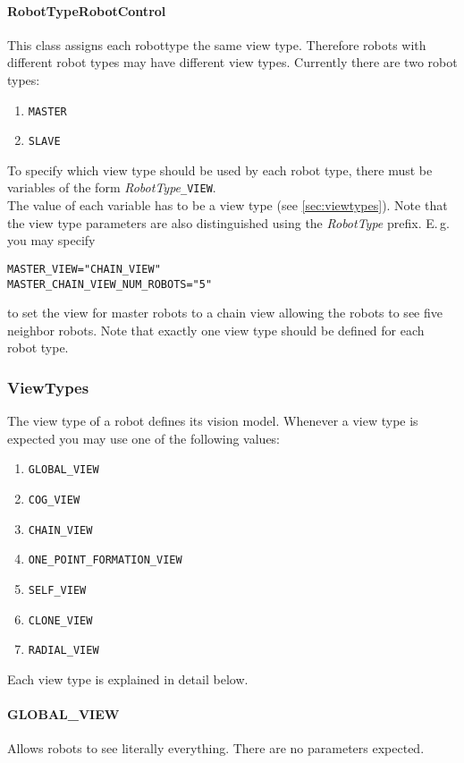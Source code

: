 \paragraph{RobotTypeRobotControl}\label{sec:robotTypeRobotControl} This class assigns each robottype the same view type. Therefore robots with different robot types may have different view types. Currently there are two robot types:
\begin{enumerate}
	\item \texttt{MASTER}
	\item \texttt{SLAVE}
\end{enumerate}
To specify which view type should be used by each robot type, there must be variables of the form \textit{RobotType}\texttt{\_VIEW}. \\
The value of each variable has to be a view type (see \ref{sec:viewtypes}). Note that the view type parameters are also distinguished using the \textit{RobotType} prefix. E.\,g. you may specify 
\begin{center}
\texttt{MASTER\_VIEW="CHAIN\_VIEW"} \\
\texttt{MASTER\_CHAIN\_VIEW\_NUM\_ROBOTS="5"}
\end{center} to set the view for master robots to a chain view allowing the robots to see five neighbor robots. Note that exactly one view type should be defined for each robot type.

\subsubsection{ViewTypes}\label{sec:viewtypes}
The view type of a robot defines its vision model. Whenever a view type is expected you may use one of the following values:
\begin{enumerate}
	\item \texttt{GLOBAL\_VIEW}
	\item \texttt{COG\_VIEW}
	\item \texttt{CHAIN\_VIEW}
	\item \texttt{ONE\_POINT\_FORMATION\_VIEW}
	\item \texttt{SELF\_VIEW}
	\item \texttt{CLONE\_VIEW}
	\item \texttt{RADIAL\_VIEW}
\end{enumerate}
Each view type is explained in detail below.

\paragraph{GLOBAL\_VIEW} Allows robots to see literally everything. There are no parameters expected.

